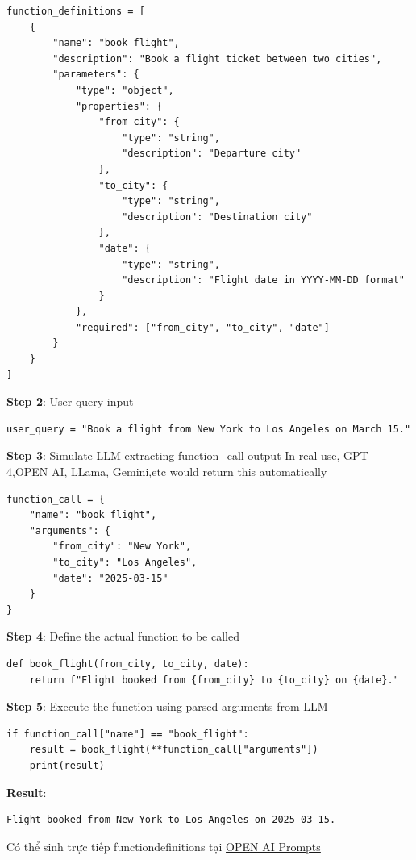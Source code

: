 \documentclass[final,letterpaper,twoside,12pt]{report}
\begin{document}
\begin{lstlisting}
function_definitions = [
	{
		"name": "book_flight",
		"description": "Book a flight ticket between two cities",
		"parameters": {
			"type": "object",
			"properties": {
				"from_city": {
					"type": "string",
					"description": "Departure city"
				},
				"to_city": {
					"type": "string",
					"description": "Destination city"
				},
				"date": {
					"type": "string",
					"description": "Flight date in YYYY-MM-DD format"
				}
			},
			"required": ["from_city", "to_city", "date"]
		}
	}
]
	\end{lstlisting}


\textbf{Step 2}: User query input

\begin{lstlisting}
user_query = "Book a flight from New York to Los Angeles on March 15."
	\end{lstlisting}

\textbf{Step 3}: Simulate LLM extracting function\_call output
In real use, GPT-4,OPEN AI, LLama, Gemini,etc would return this automatically
\begin{lstlisting}
function_call = {
	"name": "book_flight",
	"arguments": {
		"from_city": "New York",
		"to_city": "Los Angeles",
		"date": "2025-03-15"
	}
}
\end{lstlisting}


\textbf{Step 4}: Define the actual function to be called

\begin{lstlisting}
def book_flight(from_city, to_city, date):
	return f"Flight booked from {from_city} to {to_city} on {date}."
\end{lstlisting}

\newpage

\textbf{Step 5}: Execute the function using parsed arguments from LLM

\begin{lstlisting}
if function_call["name"] == "book_flight":
	result = book_flight(**function_call["arguments"])
	print(result)
\end{lstlisting}

\textbf{Result}:


\begin{lstlisting}[backgroundcolor=\color{black}, basicstyle=\color{white}\ttfamily]
	Flight booked from New York to Los Angeles on 2025-03-15.
	\end{lstlisting}

Có thể sinh trực tiếp function\textunderscore definitions tại \href{https://platform.openai.com/playground/prompts?models=gpt-4o}{OPEN AI Prompts}
\end{document}

